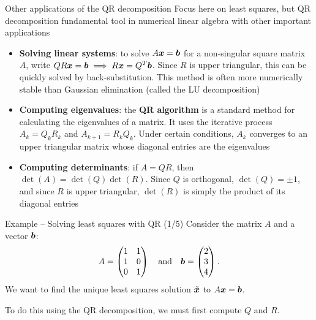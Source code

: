 \documentclass[aspectratio=169]{beamer}\usepackage[]{graphicx}\usepackage[]{xcolor}
\begin{document}
\begin{frame}{Other applications of the QR decomposition}
Focus here on least squares, but QR decomposition fundamental tool in numerical linear algebra with other important applications
\begin{itemize}
\item \textbf{Solving linear systems}: to solve $A\bm{x}=\bm{b}$ for a non-singular square matrix $A$, write $QR\bm{x}=\bm{b} \implies R\bm{x}=Q^T\bm{b}$. Since $R$ is upper triangular, this can be quickly solved by back-substitution. This method is often more numerically stable than Gaussian elimination (called the LU decomposition)
\vfill
\item \textbf{Computing eigenvalues}: the \textbf{QR algorithm} is a standard method for calculating the eigenvalues of a matrix. It uses the iterative process $A_k = Q_kR_k$ and $A_{k+1} = R_kQ_k$. Under certain conditions, $A_k$ converges to an upper triangular matrix whose diagonal entries are the eigenvalues
\vfill
\item \textbf{Computing determinants}: if $A=QR$, then $\det(A)=\det(Q)\det(R)$. Since $Q$ is orthogonal, $\det(Q)=\pm 1$, and since $R$ is upper triangular, $\det(R)$ is simply the product of its diagonal entries
\end{itemize}
\end{frame}


\begin{frame}{Example -- Solving least squares with QR (1/5)}
Consider the matrix $A$ and a vector $\bm{b}$:
\[
A = \begin{pmatrix} 1 & 1 \\ 1 & 0 \\ 0 & 1 \end{pmatrix} 
\quad\text{and}\quad 
\bm{b} = \begin{pmatrix} 2 \\ 3 \\ 4 \end{pmatrix}.
\]
We want to find the unique least squares solution $\tilde{\bm{x}}$ to $A\bm{x} = \bm{b}$.

\vfill

To do this using the QR decomposition, we must first compute $Q$ and $R$.
\end{frame}
\end{document}
